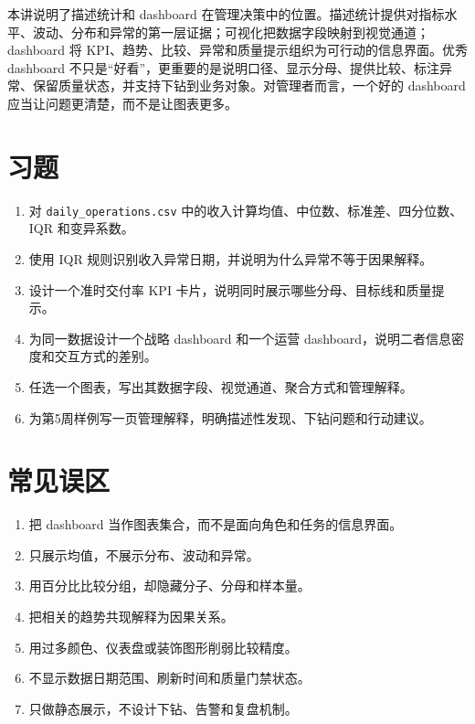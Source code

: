 \documentclass[UTF8,fontset=fandol,openany,zihao=-4]{ctexbook}
\begin{document}
本讲说明了描述统计和 dashboard 在管理决策中的位置。描述统计提供对指标水平、波动、分布和异常的第一层证据；可视化把数据字段映射到视觉通道；dashboard 将 KPI、趋势、比较、异常和质量提示组织为可行动的信息界面。优秀 dashboard 不只是“好看”，更重要的是说明口径、显示分母、提供比较、标注异常、保留质量状态，并支持下钻到业务对象。对管理者而言，一个好的 dashboard 应当让问题更清楚，而不是让图表更多。

\section*{习题}

\begin{exercise}
\begin{enumerate}
  \item 对 \texttt{daily\_operations.csv} 中的收入计算均值、中位数、标准差、四分位数、IQR 和变异系数。
  \item 使用 IQR 规则识别收入异常日期，并说明为什么异常不等于因果解释。
  \item 设计一个准时交付率 KPI 卡片，说明同时展示哪些分母、目标线和质量提示。
  \item 为同一数据设计一个战略 dashboard 和一个运营 dashboard，说明二者信息密度和交互方式的差别。
  \item 任选一个图表，写出其数据字段、视觉通道、聚合方式和管理解释。
  \item 为第5周样例写一页管理解释，明确描述性发现、下钻问题和行动建议。
\end{enumerate}
\end{exercise}

\section*{常见误区}

\begin{enumerate}
  \item 把 dashboard 当作图表集合，而不是面向角色和任务的信息界面。
  \item 只展示均值，不展示分布、波动和异常。
  \item 用百分比比较分组，却隐藏分子、分母和样本量。
  \item 把相关的趋势共现解释为因果关系。
  \item 用过多颜色、仪表盘或装饰图形削弱比较精度。
  \item 不显示数据日期范围、刷新时间和质量门禁状态。
  \item 只做静态展示，不设计下钻、告警和复盘机制。
\end{enumerate}
\end{document}
